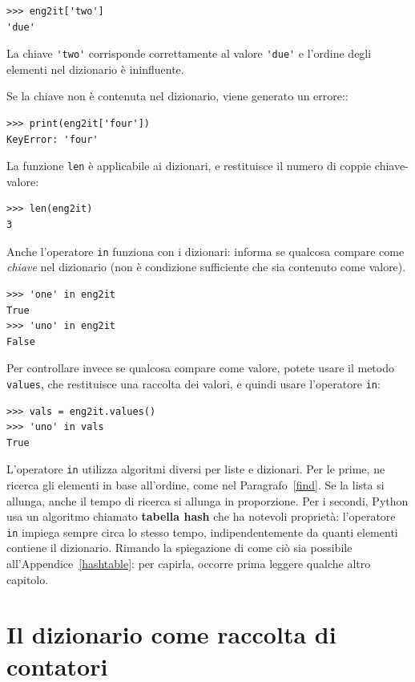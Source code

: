 \documentclass[10pt]{book}
\begin{document}
\begin{verbatim}
>>> eng2it['two']
'due'
\end{verbatim}
%
La chiave \verb"'two'" corrisponde correttamente al valore \verb"'due'" e l'ordine degli elementi nel dizionario è ininfluente.

Se la chiave non è contenuta nel dizionario, viene generato un errore::

\begin{verbatim}
>>> print(eng2it['four'])
KeyError: 'four'
\end{verbatim}
%
La funzione {\tt len} è applicabile ai dizionari, e restituisce il numero di coppie chiave-valore:

\begin{verbatim}
>>> len(eng2it)
3
\end{verbatim}
%
Anche l'operatore {\tt in} funziona con i dizionari: informa se qualcosa compare come {\em chiave} nel dizionario (non è condizione sufficiente che sia contenuto come valore).

\begin{verbatim}
>>> 'one' in eng2it
True
>>> 'uno' in eng2it
False
\end{verbatim}
%
Per controllare invece se qualcosa compare come valore, potete usare il metodo {\tt values}, che restituisce una raccolta dei valori, e quindi usare l'operatore {\tt in}:

\begin{verbatim}
>>> vals = eng2it.values()
>>> 'uno' in vals
True
\end{verbatim}
%
L'operatore {\tt in} utilizza algoritmi diversi per liste e dizionari. Per le prime, ne ricerca gli elementi in base all'ordine, come nel Paragrafo~\ref{find}.  Se la lista si allunga, anche il tempo di ricerca si allunga in proporzione. Per i secondi, Python usa un algoritmo chiamato {\bf tabella hash} che ha notevoli proprietà: l'operatore {\tt in} impiega sempre circa lo stesso tempo, indipendentemente da quanti elementi contiene il dizionario. Rimando la spiegazione di come ciò sia possibile all'Appendice~\ref{hashtable}: per capirla, occorre prima leggere qualche altro capitolo.

\section{Il dizionario come raccolta di contatori}
\label{histogram}
\end{document}
